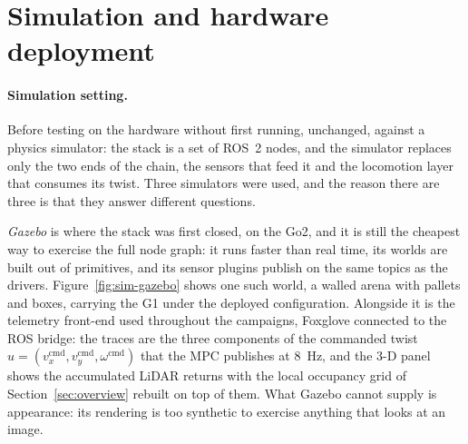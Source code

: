 \documentclass[11pt,a4paper]{article}
\begin{document}

\section{Simulation and hardware deployment}
\label{sec:deployment}

\paragraph{Simulation setting.} Before testing on the hardware without first running, unchanged,
against a physics simulator: the stack is a set of ROS~2 nodes, and the simulator replaces only the two ends
of the chain, the sensors that feed it and the locomotion layer that consumes its twist. Three simulators
were used, and the reason there are three is that they answer different questions.

\emph{Gazebo} is where the stack was first closed, on the Go2, and it is still the cheapest way to exercise
the full node graph: it runs faster than real time, its worlds are built out of primitives, and its sensor
plugins publish on the same topics as the drivers. Figure~\ref{fig:sim-gazebo} shows one such world, a walled
arena with pallets and boxes, carrying the G1 under the deployed configuration. Alongside it is the telemetry
front-end used throughout the campaigns, Foxglove connected to the ROS bridge: the traces are the three
components of the commanded twist $u=(v_x^{\mathrm{cmd}},v_y^{\mathrm{cmd}},\omega^{\mathrm{cmd}})$ that the
MPC publishes at $8$~Hz, and the 3-D panel shows the accumulated LiDAR returns with the local occupancy grid
of Section~\ref{sec:overview} rebuilt on top of them. What Gazebo cannot supply is appearance: its rendering
is too synthetic to exercise anything that looks at an image.
\end{document}

